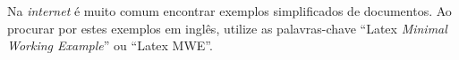 \begin{marker}
  Na \textit{internet} é muito comum encontrar exemplos simplificados de documentos. Ao procurar por estes exemplos em inglês, utilize as palavras-chave ``Latex \textit{Minimal Working Example}'' ou ``Latex MWE''.
\end{marker}


